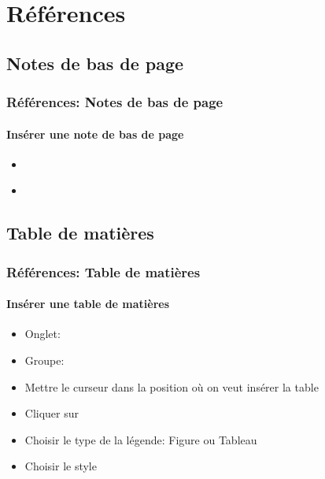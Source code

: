 \documentclass[xcolor=table]{beamer}
\begin{document}
\section{Références}

%

\subsection{Notes de bas de page}

\begin{frame}[t]
\frametitle{Références: Notes de bas de page}
\framesubtitle{Insérer une note de bas de page}

\begin{minipage}{0.69\textwidth}
	\begin{itemize}
		\item 
	\end{itemize}
\end{minipage}
\begin{minipage}{0.30\textwidth}
\end{minipage}

\begin{itemize}
	\item 
\end{itemize}

\end{frame}

\subsection{Table de matières}

\begin{frame}
\frametitle{Références: Table de matières}
\framesubtitle{Insérer une table de matières}

\begin{minipage}{0.59\textwidth}
	\begin{itemize}
		\item Onglet: 
		\item Groupe: 
		\item Mettre le curseur dans la position où on veut insérer la table
		\item Cliquer sur 
		\item Choisir le type de la légende: Figure ou Tableau
		\item Choisir le style
	\end{itemize}
\end{minipage}
\begin{minipage}{0.40\textwidth}
\end{minipage}

\end{frame}
\end{document}
